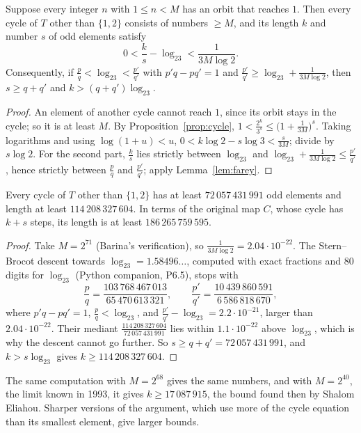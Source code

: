 \begin{theorem}\label{thm:cyclelength}
Suppose every integer $n$ with $1\le n<M$ has an orbit that reaches $1$. Then every cycle of $T$ other than $\{1,2\}$ consists of numbers $\ge M$, and its
length $k$ and number $s$ of odd elements satisfy
\[
0<\frac ks-\log_23<\frac1{3M\log2}.
\]
Consequently, if $\frac pq<\log_23<\frac{p'}{q'}$ with $p'q-pq'=1$ and $\frac{p'}{q'}\ge\log_23+\frac1{3M\log2}$, then $s\ge q+q'$ and
$k>(q+q')\log_23$.
\end{theorem}
\begin{proof}
An element of another cycle cannot reach $1$, since its orbit stays in the cycle; so it is at least $M$. By Proposition~\ref{prop:cycle},
$1<\frac{2^k}{3^s}\le\bigl(1+\frac1{3M}\bigr)^s$. Taking logarithms and using $\log(1+u)<u$,
$0<k\log2-s\log3<\frac s{3M}$; divide by $s\log2$. For the second part, $\frac ks$ lies strictly between $\log_23$ and
$\log_23+\frac1{3M\log2}\le\frac{p'}{q'}$, hence strictly between $\frac pq$ and $\frac{p'}{q'}$; apply Lemma~\ref{lem:farey}.
\end{proof}

\begin{corollary}\label{cor:cyclebound}
Every cycle of $T$ other than $\{1,2\}$ has at least $72\,057\,431\,991$ odd elements and length at least $114\,208\,327\,604$. In terms of the original map $C$,
whose cycle has $k+s$ steps, its length is at least $186\,265\,759\,595$.
\end{corollary}
\begin{proof}
Take $M=2^{71}$ (Barina's verification), so $\frac1{3M\log2}=2.04\cdot10^{-22}$. The Stern--Brocot descent towards $\log_23=1.58496\ldots$, computed
with exact fractions and $80$ digits for $\log_23$ (Python companion, P6.5), stops with
\[
\frac pq=\frac{103\,768\,467\,013}{65\,470\,613\,321},\qquad\frac{p'}{q'}=\frac{10\,439\,860\,591}{6\,586\,818\,670},
\]
where $p'q-pq'=1$, $\frac pq<\log_23$, and $\frac{p'}{q'}-\log_23=2.2\cdot10^{-21}$, larger than $2.04\cdot10^{-22}$. Their mediant
$\frac{114\,208\,327\,604}{72\,057\,431\,991}$ lies within $1.1\cdot10^{-22}$ above $\log_23$, which is why the descent cannot go further. So
$s\ge q+q'=72\,057\,431\,991$, and $k>s\log_23$ gives $k\ge114\,208\,327\,604$.
\end{proof}

The same computation with $M=2^{68}$ gives the same numbers, and with $M=2^{40}$, the limit known in 1993, it gives $k\ge17\,087\,915$, the bound found
then by Shalom Eliahou. Sharper versions of the argument, which use more of the cycle equation than its smallest element, give larger bounds.

